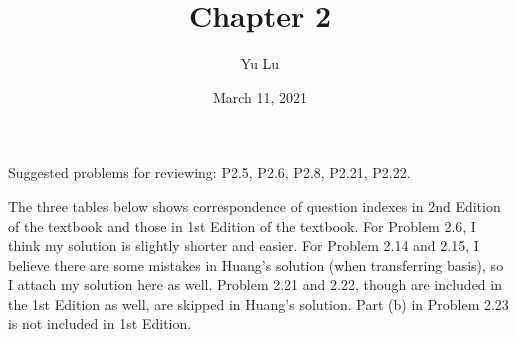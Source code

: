 \documentclass{article}
\title{Chapter 2}
\date{March 11, 2021}
\author{Yu Lu}
\begin{document}
\newcommand{\pz}{\ket{\vb{+z}}}
\newcommand{\nz}{\ket{\vb{-z}}}
\newcommand{\px}{\ket{\vb{+x}}}
\newcommand{\nx}{\ket{\vb{-x}}}
\newcommand{\py}{\ket{\vb{+y}}}
\newcommand{\ny}{\ket{\vb{-y}}}

\newcommand{\pxexpr}{ \frac{1}{\sqrt{2}} \pz + \frac{1}{\sqrt{2}} \nz}
\newcommand{\nxexpr}{ \frac{1}{\sqrt{2}} \pz - \frac{1}{\sqrt{2}} \nz}
\newcommand{\pyexpr}{ \frac{1}{\sqrt{2}} \pz + \frac{i}{\sqrt{2}} \nz}
\newcommand{\nyexpr}{ \frac{1}{\sqrt{2}} \pz - \frac{i}{\sqrt{2}} \nz}
\newcommand{\rot}[1]{\hat{R}(\phi \hat{#1})} %
\newcommand{\rott}[2]{\hat{R}(#1 \hat{#2})} %
\newcommand{\sm}[4]{\pmqty{\braket{#1}{#3}& \braket{#1}{#4} \\ \braket{#2}{#3} & \braket{#2}{#4}}} %
\newcommand{\basexp}[1]{\xrightarrow{\ket{#1}}} %
    \maketitle
    Suggested problems for reviewing: P2.5, P2.6, P2.8, P2.21, P2.22.

    The three tables below shows correspondence of question indexes in 2nd Edition of the textbook and those in 1st Edition of the textbook. For Problem 2.6, I think my solution is slightly shorter and easier. For Problem 2.14 and 2.15, I believe there are some mistakes in Huang's solution (when transferring basis), so I attach my solution here as well. Problem 2.21 and 2.22, though are included in the 1st Edition as well, are skipped in Huang's solution. Part (b) in Problem 2.23 is not included in 1st Edition. 
    
\end{document}
